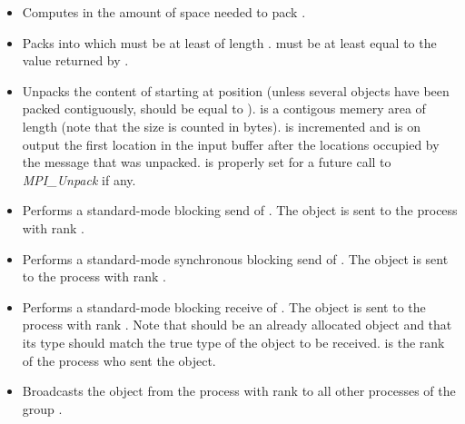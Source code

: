 \begin{itemize}
\item {}
  \sshortdescribe Computes in  the amount of space needed to pack .
\item {}
  \sshortdescribe Packs  into  which must be at least of
  length .  must be at least equal to the value returned
  by . 
\item {}
  \sshortdescribe Unpacks the content of  starting at position
   (unless several objects have been packed contiguously,  should be equal to ).  is a contigous memery area
  of length  (note that the size is counted in bytes).
   is incremented and is on output the first location in the input
  buffer after the locations occupied by the message that was
  unpacked.  is properly set for a future call to {\it MPI_Unpack}
  if any.
  
\item {}
  \sshortdescribe Performs a standard-mode blocking send of . The
  object is sent to the process with rank .

\item {}
  \sshortdescribe Performs a standard-mode synchronous blocking send of
  . The object is sent to the process with rank .
  
\item {} 
  \sshortdescribe Performs a standard-mode blocking receive of . The
  object is sent to the process with rank . Note that 
  should be an already allocated object and that its type should match the
  true type of the object to be received.  is the rank of the
  process who sent the object.

  
\item {}
  \sshortdescribe Broadcasts the object  from the process with rank
   to all other processes of the group .
\end{itemize}


